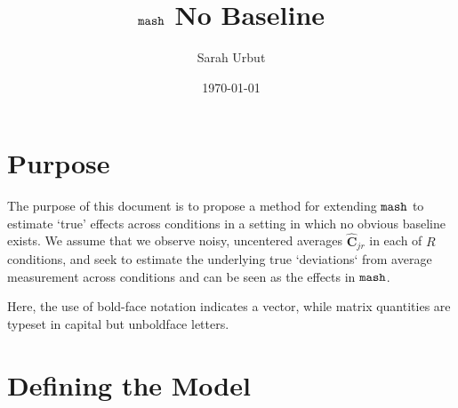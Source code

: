 \documentclass[11pt, oneside]{article}   	%
\title{ $\mash$ No Baseline}
\author{Sarah Urbut}
\date{\today}
\newcommand{\chat}{\bm{\hat{C}}}
\def\mash{{\tt mash}}
\begin{document}
\maketitle

\tableofcontents
\newpage

\section{Purpose}

The purpose of this document is to propose a method for extending $\mash$ to estimate `true' effects across conditions in a setting in which no obvious baseline exists. We assume that we observe noisy, uncentered averages $\chat_{jr}$ in each of $R$ conditions, and seek to estimate the underlying true `deviations` from average measurement across conditions and can be seen as the effects in $\mash$.

Here, the use of bold-face notation indicates a vector, while matrix quantities are typeset in capital but unboldface letters.



\section{Defining the Model}

% 
%
\end{document}
